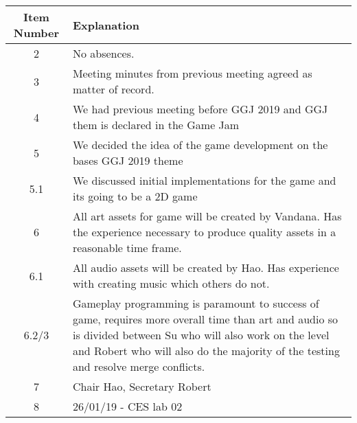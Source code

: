 \documentclass{article}
\begin{document}
\begin{table}[H]
	\centering
	\begin{tabular}{| c | p{9cm} |}
		\hline
		Item Number & Explanation \\ \hline
		2 & No absences.\\ \hline
		3 & Meeting minutes from previous meeting agreed as matter of record. \\ \hline
		4 & We had previous meeting before GGJ 2019 and GGJ them is declared in the Game Jam \\ \hline 
		5 & We decided the idea of the game development on the bases GGJ 2019 theme \\ \hline
		5.1 & We discussed initial implementations for the game and its going to be a 2D game \\ \hline
		6 & All art assets for game will be created by Vandana. Has the experience necessary to produce quality assets in a reasonable time frame. \\ \hline
		6.1 & All audio assets will be created by Hao. Has experience with creating music which others do not.\\ \hline
		6.2/3 & Gameplay programming is paramount to success of game, requires more overall time than art and audio so is divided between Su who will also work on the level and Robert who will also do the majority of the testing and resolve merge conflicts. \\  \hline
		7 & Chair Hao, Secretary Robert \\ \hline
		8 & 26/01/19 - CES lab 02   \\ \hline

		
	\end{tabular}
\end{table}
\end{document}
